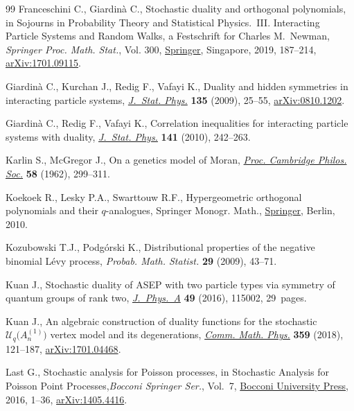 \documentclass[10pt,a4paper]{amsart}
\numberwithin{equation}{section}
\newcommand{\1}{\mathbbm{1}}
\begin{document}
\begin{thebibliography}{99}
Franceschini C., Giardin\`a C., Stochastic duality and orthogonal polynomials,
 in Sojourns in Probability Theory and Statistical Physics.~{III}.
 {I}nteracting Particle Systems and Random Walks, a {F}estschrift for
 {C}harles {M}.~{N}ewman, \textit{Springer Proc. Math. Stat.}, Vol. 300,
 \href{https://doi.org/10.1007/978-981-15-0302-3_7}{Springer}, Singapore, 2019, 187--214, \href{https://arxiv.org/abs/1701.09115}{arXiv:1701.09115}.

Giardin\`a C., Kurchan J., Redig F., Vafayi K., Duality and hidden symmetries
 in interacting particle systems, \href{https://doi.org/10.1007/s10955-009-9716-2}{\textit{J.~Stat. Phys.}} \textbf{135} (2009),
 25--55, \href{https://arxiv.org/abs/0810.1202}{arXiv:0810.1202}.

Giardin\`a C., Redig F., Vafayi K., Correlation inequalities for interacting
 particle systems with duality, \href{https://doi.org/10.1007/s10955-010-0055-0}{\textit{J.~Stat. Phys.}} \textbf{141} (2010),
 242--263.

Karlin S., McGregor J., On a genetics model of {M}oran, \href{https://doi.org/10.1017/S0305004100036513}{\textit{Proc. Cambridge
 Philos. Soc.}} \textbf{58} (1962), 299--311.

Koekoek R., Lesky P.A., Swarttouw R.F., Hypergeometric orthogonal polynomials
 and their {$q$}-analogues, Springer Monogr. Math., \href{https://doi.org/10.1007/978-3-642-05014-5}{Springer}, Berlin, 2010.

Kozubowski T.J., Podg\'orski K., Distributional properties of the negative
 binomial {L}\'evy process, \textit{Probab. Math. Statist.} \textbf{29}
 (2009), 43--71.

Kuan J., Stochastic duality of {ASEP} with two particle types via symmetry of
 quantum groups of rank two, \href{https://doi.org/10.1088/1751-8113/49/11/115002}{\textit{J.~Phys.~A}} \textbf{49} (2016), 115002,
 29~pages.

Kuan J., An algebraic construction of duality functions for the stochastic
 {$\mathcal{U}_q\bigl( A_n^{(1)}\bigr)$} vertex model and its degenerations,
 \href{https://doi.org/10.1007/s00220-018-3108-x}{\textit{Comm. Math. Phys.}} \textbf{359} (2018), 121--187,
 \href{https://arxiv.org/abs/1701.04468}{arXiv:1701.04468}.

Last G., Stochastic analysis for {P}oisson processes, in Stochastic Analysis
 for {P}oisson Point Processes,\textit{Bocconi Springer Ser.}, Vol.~7,
 \href{https://doi.org/10.1007/978-3-319-05233-5_1}{Bocconi University Press}, 2016, 1--36, \href{https://arxiv.org/abs/1405.4416}{arXiv:1405.4416}.


\end{thebibliography}
\end{document}
